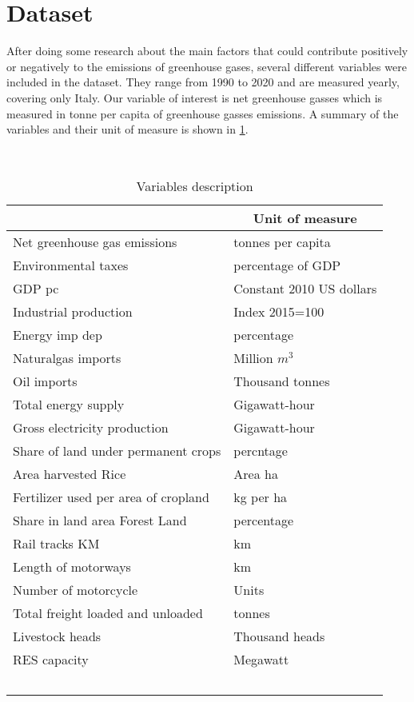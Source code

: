 \documentclass[12pt]{article}
\begin{document}
\clearpage

\section{Dataset} \label{Dataset}
After doing some research about the main factors that could contribute positively or negatively to the emissions of greenhouse gases, several different variables were included in the dataset. They range from 1990 to 2020 and are measured yearly, covering only Italy. Our variable of interest is net greenhouse gasses which is measured in tonne per capita of greenhouse gasses emissions. A summary of the variables and their unit of measure is shown in \ref{tab:variables}. \\

\begin{table}[H]
    \begin{center}
    \begin{tabular}{ll} \hline
    \multicolumn{1}{c}{\textbf{Features}} & \multicolumn{1}{c}{\textbf{Unit of measure}} \\ \hline
        Net greenhouse gas emissions  & tonnes per capita \\
        Environmental taxes  & percentage of GDP \\
        GDP pc & Constant 2010 US dollars \\
        Industrial production  & Index 2015=100 \\
        Energy imp dep & percentage \\
        Naturalgas imports & Million $m^3$ \\
        Oil imports & Thousand tonnes \\
        Total energy supply & Gigawatt-hour \\ 
        Gross electricity production & Gigawatt-hour \\
        Share of land under permanent crops & percntage \\
        Area harvested Rice & Area ha \\
        Fertilizer used per area of cropland & kg per ha \\
        Share in land area Forest Land & percentage \\ 
        Rail tracks KM & km \\
        Length of motorways & km \\
        Number of motorcycle & Units \\
        Total freight loaded and unloaded & tonnes \\
        Livestock heads & Thousand heads \\
        RES capacity & Megawatt \\ \hline
    \end{tabular}
    \caption{Variables description} \label{tab:variables}
    \end{center}
\end{table}
\end{document}
